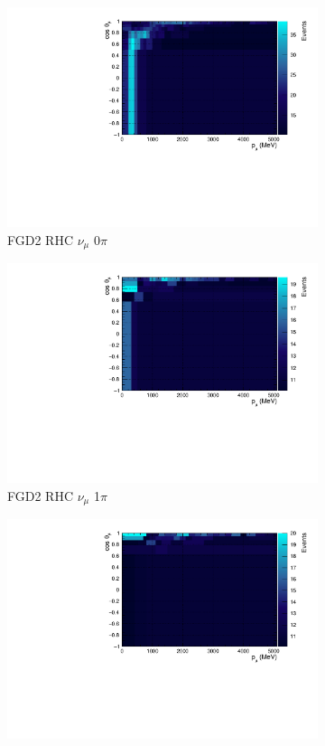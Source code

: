 \begin{figure}
\begin{subfigure}{.32\textwidth}
  \includegraphics[width=0.95\linewidth]{figs/TH2Poly_MC_FGD2_NuMuBkg_CC0pi_in_AntiNu_Mode}
  \caption{FGD2 RHC $\nu_{\mu}$ 0$\pi$}
  \label{fig:th2polyFGD2_NuMuBkg_CC0pi_in_AntiNu_Mode}
\end{subfigure}
\begin{subfigure}{.32\textwidth}
  \centering
  \includegraphics[width=0.95\linewidth]{figs/TH2Poly_MC_FGD2_NuMuBkg_CC1pi_in_AntiNu_Mode}
  \caption{FGD2 RHC $\nu_{\mu}$ 1$\pi$}
  \label{fig:th2polyFGD2_NuMuBkg_CC1pi_in_AntiNu_Mode}
\end{subfigure}
\begin{subfigure}{.32\textwidth}
  \centering
  \includegraphics[width=0.95\linewidth]{figs/TH2Poly_MC_FGD2_NuMuBkg_CCOther_in_AntiNu_Mode}

\end{subfigure}
\end{figure}
